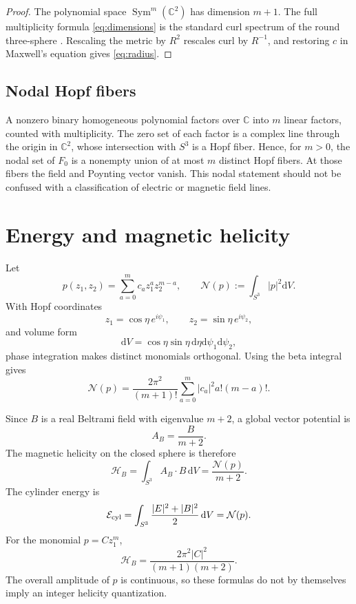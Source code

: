 \documentclass[11pt,a4paper]{article}
\numberwithin{equation}{section}
\theoremstyle{remark}
\newcommand{\CC}{\mathbb{C}}
\newcommand{\dd}{\mathrm{d}}
\newcommand{\cN}{\mathcal{N}}
\begin{document}
\begin{proof}
The polynomial space \(\operatorname{Sym}^m(\CC^2)\) has dimension \(m+1\). The full multiplicity formula \eqref{eq:dimensions} is the standard curl spectrum of the round three-sphere \cite{Baer2019}. Rescaling the metric by \(R^2\) rescales curl by \(R^{-1}\), and restoring \(c\) in Maxwell's equation gives \eqref{eq:radius}.
\end{proof}

\subsection{Nodal Hopf fibers}

A nonzero binary homogeneous polynomial factors over \(\CC\) into \(m\) linear factors, counted with multiplicity. The zero set of each factor is a complex line through the origin in \(\CC^2\), whose intersection with \(S^3\) is a Hopf fiber. Hence, for \(m>0\), the nodal set of \(F_0\) is a nonempty union of at most \(m\) distinct Hopf fibers. At those fibers the field and Poynting vector vanish. This nodal statement should not be confused with a classification of electric or magnetic field lines.

\section{Energy and magnetic helicity}

Let
\begin{equation}
 p(z_1,z_2)=\sum_{a=0}^m c_a z_1^a z_2^{m-a},
 \qquad
 \cN(p):=\int_{S^3}|p|^2\dd V.
\end{equation}
With Hopf coordinates
\[
 z_1=\cos\eta\,e^{i\psi_1},
 \qquad
 z_2=\sin\eta\,e^{i\psi_2},
\]
and volume form
\[
 \dd V=\cos\eta\sin\eta\,\dd\eta\dd\psi_1\dd\psi_2,
\]
phase integration makes distinct monomials orthogonal. Using the beta integral gives
\begin{equation}\label{eq:norm}
 \boxed{
 \cN(p)=\frac{2\pi^2}{(m+1)!}
 \sum_{a=0}^m |c_a|^2a!(m-a)! .}
\end{equation}

Since \(B\) is a real Beltrami field with eigenvalue \(m+2\), a global vector potential is
\[
 A_B=\frac{B}{m+2}.
\]
The magnetic helicity on the closed sphere is therefore
\begin{equation}\label{eq:helicity}
 \boxed{
 \mathcal H_B
 =\int_{S^3}A_B\cdot B\,\dd V
 =\frac{\cN(p)}{m+2}.}
\end{equation}
The cylinder energy is
\begin{equation}\label{eq:energy}
 \mathcal E_{\rm cyl}
 =\int_{S^3}\frac{|E|^2+|B|^2}{2}\,\dd V
 =\cN(p).
\end{equation}
For the monomial \(p=Cz_1^m\),
\begin{equation}
 \mathcal H_B
 =\frac{2\pi^2|C|^2}{(m+1)(m+2)}.
\end{equation}
The overall amplitude of \(p\) is continuous, so these formulas do not by themselves imply an integer helicity quantization.
\end{document}
